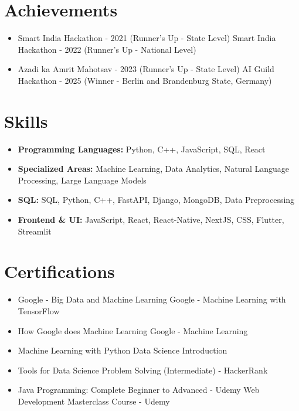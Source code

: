 \documentclass[a4paper,10pt]{article}
\begin{document}
\section*{Achievements}
\begin{itemize}
\item Smart India Hackathon - 2021 (Runner's Up - State Level) \hfill Smart India Hackathon - 2022 (Runner's Up - National Level)
\item Azadi ka Amrit Mahotsav - 2023 (Runner's Up - State Level) \hfill AI Guild Hackathon - 2025 (Winner - Berlin and Brandenburg State, Germany)
\end{itemize}

\section*{Skills}
\begin{itemize}
  \item \textbf{Programming Languages:} Python, C++, JavaScript, SQL, React
  \item \textbf{Specialized Areas:} Machine Learning, Data Analytics, Natural Language Processing, Large Language Models
  \item \textbf{SQL:} SQL, Python, C++, FastAPI, Django, MongoDB, Data Preprocessing
  \item \textbf{Frontend \& UI:} JavaScript, React, React-Native, NextJS, CSS, Flutter, Streamlit
\end{itemize}

\section*{Certifications}
\begin{itemize}
\item Google - Big Data and Machine Learning \hfill Google - Machine Learning with TensorFlow
\item How Google does Machine Learning \hfill Google - Machine Learning
\item Machine Learning with Python \hfill Data Science Introduction
\item Tools for Data Science \hfill Problem Solving (Intermediate) - HackerRank
\item Java Programming: Complete Beginner to Advanced - Udemy \hfill Web Development Masterclass Course - Udemy
\end{itemize}
\end{document}
